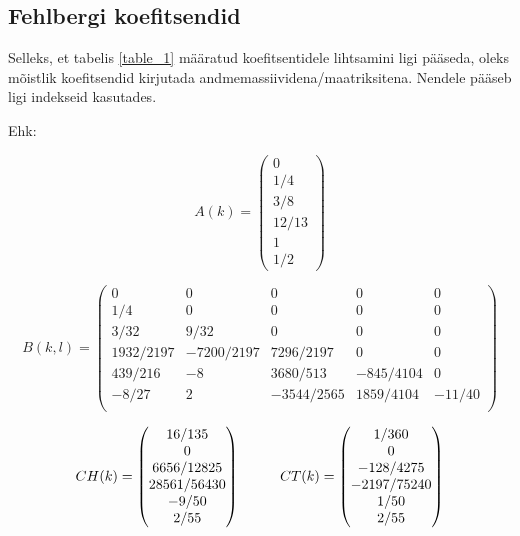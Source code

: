 \begin{flushleft}

\section{Fehlbergi koefitsendid}
 
Selleks, et tabelis \ref{table_1} määratud koefitsentidele lihtsamini ligi pääseda, oleks mõistlik koefitsendid kirjutada andmemassiividena/maatriksitena. Nendele pääseb ligi indekseid kasutades.


Ehk:

\begin{equation}
A(k)=
\begin{pmatrix}
0\\
1/4\\
3/8\\
12/13\\
1\\
1/2
\end{pmatrix}
\end{equation}
 

\begin{equation}
B(k,l)=
\begin{pmatrix}
0&0&0&0&0\\

1/4&0&0&0&0\\

3/32 & 9/32 & 0 & 0 & 0 \\

1932/2197 & -7200/2197 & 7296/2197 & 0 & 0\\

439/216 & -8 & 3680/513 & -845/4104 & 0\\

-8/27 & 2 & -3544/2565 & 1859/4104 & -11/40 \\
\end{pmatrix}
\end{equation}

\begin{equation}
CH(k)=
\begin{pmatrix}
16/135\\
0\\
6656/12825\\
28561/56430\\
-9/50\\
2/55
\end{pmatrix}
\hspace{10mm}
CT(k)=
\begin{pmatrix}
1/360\\
0\\
-128/4275\\
-2197/75240\\
1/50\\
2/55
\end{pmatrix}
\end{equation}



\end{flushleft}
